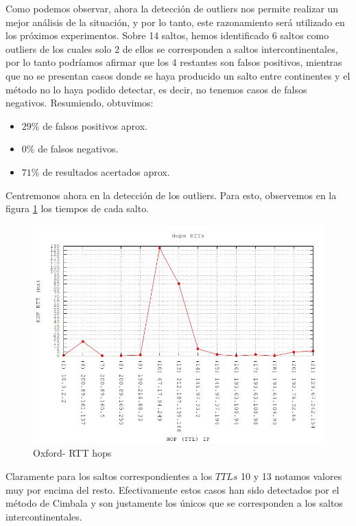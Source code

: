 Como podemos observar, ahora la detección de outliers nos permite realizar un mejor análisis de la situación, y por lo tanto, este razonamiento será utilizado en los próximos experimentos. Sobre 14 saltos, hemos identificado 6 saltos como outliers de los cuales solo 2 de ellos se corresponden a saltos intercontinentales, por lo tanto podríamos afirmar que los 4 restantes son falsos positivos, mientras que no se presentan casos donde se haya producido un salto entre continentes y el método no lo haya podido detectar, es decir, no tenemos casos de falsos negativos. Resumiendo, obtuvimos:

\begin{itemize}
	\item $29 \% $ de falsos positivos aprox.
	\item $0 \%$ de falsos negativos.
	\item $71 \%$ de resultados acertados aprox.
\end{itemize}

Centremonos ahora en la detección de los outliers. Para esto, observemos en la figura \ref{tiempos-oxford} los tiempos de cada salto.

\begin{figure}[!htbp]
  \centering
    \includegraphics[scale=0.5]{imagenes/oxford-graficos/traceroute-oxford.jpg}
  \caption{Oxford- RTT hops}
  \label{tiempos-oxford}
\end{figure}


Claramente para los saltos correspondientes a los $TTLs$ 10 y 13 notamos valores muy por encima del resto. Efectivamente estos casos han sido detectados por el método de Cimbala y son justamente los únicos que se corresponden a los saltos intercontinentales.


